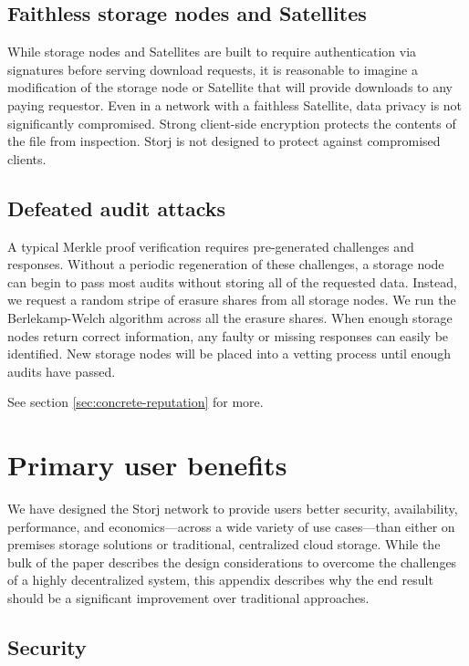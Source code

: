 \documentclass[8pt,fleqn,openany]{book}
\begin{document}
\section{Faithless storage nodes and Satellites}

While storage nodes and Satellites are built to require authentication via
signatures before serving download requests, it is reasonable to imagine a
modification of the storage node or Satellite that will provide downloads to
any paying requestor.
Even in a network with a faithless Satellite, data privacy is not significantly
compromised.
Strong client-side encryption protects the contents of the file from
inspection.
Storj is not designed to protect against compromised clients.

\section{Defeated audit attacks}

A typical Merkle proof verification requires pre-generated challenges and
responses.
Without a periodic regeneration of these challenges, a storage node can begin
to pass most audits without storing all of the requested data.
Instead, we request a random stripe of erasure shares from all storage nodes.
We run the Berlekamp-Welch algorithm\cite{bw} across all the
erasure shares.
When enough storage nodes return correct information, any faulty or missing
responses can easily be identified.
New storage nodes will be placed into a vetting process until enough audits
have passed.

See section \ref{sec:concrete-reputation} for more.

\chapter{Primary user benefits}

We have designed the Storj network to provide users better security,
availability, performance, and economics---across a wide variety of use
cases---than either on premises storage solutions or traditional, centralized
cloud storage. While the bulk of the paper describes the design considerations
to overcome the challenges of a highly decentralized system, this appendix
describes why the end result should be a significant improvement over
traditional approaches.

\section{Security}
\end{document}
